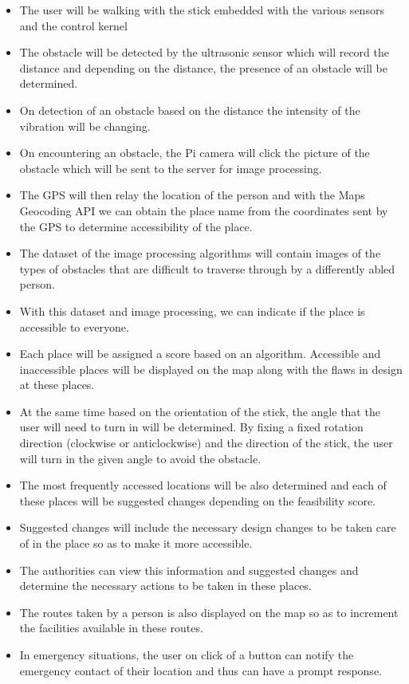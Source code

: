\begin{itemize}
\item
The user will be walking with the stick embedded with the various sensors and the control kernel
\item
The obstacle will be detected by the ultrasonic sensor which will record the distance and depending on the distance, the presence of an obstacle will be determined.
\item
On detection of an obstacle based on the distance the intensity of the vibration will be changing.
\item
On encountering an obstacle, the Pi camera will click the picture of the obstacle which will be sent to the server for image processing.
\item
The GPS will then relay the location of the person and with the Maps Geocoding API we can obtain the place name from the coordinates sent by the GPS to determine accessibility of the place. 
\item
The dataset of the image processing algorithms will contain images of the types of obstacles that are difficult to traverse through by a differently abled person.
\item
With this dataset and image processing, we can indicate if the place is accessible to everyone.
\item
Each place will be assigned a score based on an algorithm. Accessible and inaccessible places will be displayed on the map along with the flaws in design at these places.
\item
At the same time based on the orientation of the stick, the angle that the user will need to turn in will be determined. By fixing a fixed rotation direction (clockwise or anticlockwise) and the direction of the stick, the user will turn in the given angle to avoid the obstacle. 
\item
The most frequently accessed locations will be also determined and each of these places will be suggested changes depending on the feasibility score.
\item
Suggested changes will include the necessary design changes to be taken care of in the place so as to make it more accessible.
\item
The authorities can view this information and suggested changes and determine the necessary actions to be taken in these places. 
\item
The routes taken by a person is also displayed on the map so as to increment the facilities available in these routes.
\item
In emergency situations, the user on click of a button can notify the emergency contact of their location and thus can have a prompt response.
\end{itemize}


